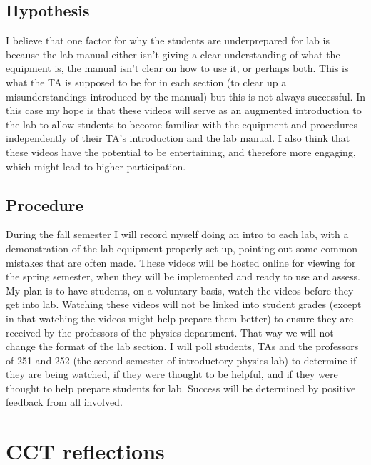 \documentclass{article}
\begin{document}
\subsection{Hypothesis}
\hspace{0.5cm}I believe that one factor for why the students are underprepared for lab is because the lab manual either isn't giving a clear understanding of what the equipment is, the manual isn't clear on how to use it, or perhaps both. This is what the TA is supposed to be for in each section (to clear up a misunderstandings introduced by the manual) but this is not always successful. In this case my hope is that these videos will serve as an augmented introduction to the lab to allow students to become familiar with the equipment and procedures independently of their TA's introduction and the lab manual. I also think that these videos have the potential to be entertaining, and therefore more engaging, which might lead to higher participation. 
\subsection{Procedure}
\hspace{0.5cm}During the fall semester I will record myself doing an intro to each lab, with a demonstration of the lab equipment properly set up, pointing out some common mistakes that are often made. These videos will be hosted online for viewing for the spring semester, when they will be implemented and ready to use and assess. 
My plan is to have students, on a voluntary basis, watch the videos before they get into lab. Watching these videos will not be linked into student grades (except in that watching the videos might help prepare them better) to ensure they are received by the professors of the physics department. That way we will not change the format of the lab section. I will poll students, TAs and the professors of 251 and 252 (the second semester of introductory physics lab) to determine if they are being watched, if they were thought to be helpful, and if they were thought to help prepare students for lab. Success will be determined by positive feedback from all involved.
\newpage


\section{CCT reflections}
\end{document}
